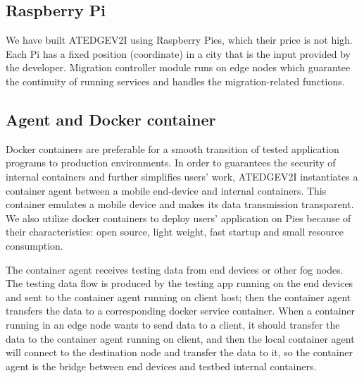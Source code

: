 \documentclass[conference]{IEEEtran}
\begin{document}
\subsection{Raspberry Pi}
\par We have built ATEDGEV2I using Raspberry Pies, which their price is not high. Each Pi has a fixed position (coordinate) in a city that is the input provided by the developer. Migration controller module runs on edge nodes which guarantee the continuity of running services and handles the migration-related functions.
\subsection{Agent and Docker container}
\par Docker containers are preferable for a smooth transition of tested application programs to production environments.
In order to guarantees the security of internal containers and further simplifies users' work, ATEDGEV2I instantiates a container agent between a mobile end-device and internal containers. This container emulates a mobile device and makes its data transmission transparent. We also utilize docker containers to deploy users' application on Pies because of their characteristics: open source, light weight, fast startup and small resource consumption. 
\par The container agent receives testing data from end devices or other fog nodes. The testing data flow is produced by the testing app running on the end devices and sent to the container agent running on client host; then the container agent transfers the data to a corresponding docker service container. When a container running in an edge node wants to send data to a client, it should transfer the data to the container agent running on client, and then the local container agent will connect to the destination node and transfer the data to it, so the container agent is the bridge between end devices and testbed internal containers.
\end{document}
